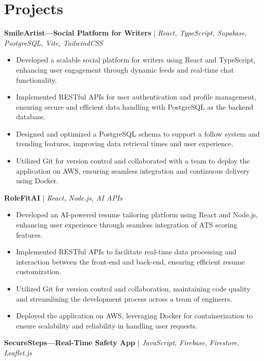 \documentclass[10pt,a4paper]{article}
\begin{document}
\section{Projects}
\textbf{SmileArtist—Social Platform for Writers} \hfill \href{app.smileartist.org}{\faExternalLinkAlt} | \textit{React, TypeScript, Supabase, PostgreSQL, Vite, TailwindCSS} \\
\begin{itemize}[leftmargin=*,itemsep=0pt]
  \item {Developed a scalable social platform for writers using React and TypeScript, enhancing user engagement through dynamic feeds and real-time chat functionality.}
  \item {Implemented RESTful APIs for user authentication and profile management, ensuring secure and efficient data handling with PostgreSQL as the backend database.}
  \item {Designed and optimized a PostgreSQL schema to support a follow system and trending features, improving data retrieval times and user experience.}
  \item {Utilized Git for version control and collaborated with a team to deploy the application on AWS, ensuring seamless integration and continuous delivery using Docker.}
\end{itemize}
\vspace{2pt}
\textbf{RoleFitAI} \hfill \href{https://rolefitai.smileartist.org}{\faExternalLinkAlt} | \textit{React, Node.js, AI APIs} \\
\begin{itemize}[leftmargin=*,itemsep=0pt]
  \item {Developed an AI-powered resume tailoring platform using React and Node.js, enhancing user experience through seamless integration of ATS scoring features.}
  \item {Implemented RESTful APIs to facilitate real-time data processing and interaction between the front-end and back-end, ensuring efficient resume customization.}
  \item {Utilized Git for version control and collaboration, maintaining code quality and streamlining the development process across a team of engineers.}
  \item {Deployed the application on AWS, leveraging Docker for containerization to ensure scalability and reliability in handling user requests.}
\end{itemize}
\vspace{2pt}
\textbf{SecureSteps—Real-Time Safety App} \hfill \href{securesteps.smileartist.org}{\faExternalLinkAlt} | \textit{JavaScript, Firebase, Firestore, Leaflet.js} \\
\end{document}

